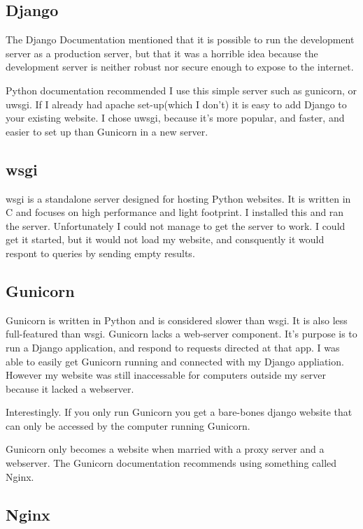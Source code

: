 \subsection{Django}

The Django Documentation mentioned that it is possible to run the development server as a production server, but that it was a horrible idea because the development server is neither robust nor secure enough to expose to the internet.

Python documentation recommended I use this simple server such as gunicorn, or uwsgi.  If I already had apache set-up(which I don't) it is easy to add Django to your existing website.  I chose uwsgi, because it's more popular, and faster, and easier to set up than Gunicorn in a new server.


\subsection{wsgi}

wsgi is a standalone server designed for hosting Python websites.   It is written in C and focuses on high performance and light footprint.  I installed this and ran the server.  Unfortunately I could not manage to get the server to work.  I could get it started, but it would not load my website, and consquently it would respont to queries by sending empty results.

\subsection{Gunicorn}

Gunicorn is written in Python and is considered slower than wsgi.  It is also less full-featured than wsgi.  Gunicorn lacks a web-server component.  It's purpose is to run a Django application, and respond to requests directed at that app.  I was able to easily get Gunicorn running and connected with my Django appliation.  However my website was still inaccessable for computers outside my server because it lacked a webserver.

Interestingly.  If you only run Gunicorn you get a bare-bones django website that can only be accessed by the computer running Gunicorn.

Gunicorn only becomes a website when married with a proxy server and a webserver.  The Gunicorn documentation recommends using something called Nginx.

\subsection{Nginx}

